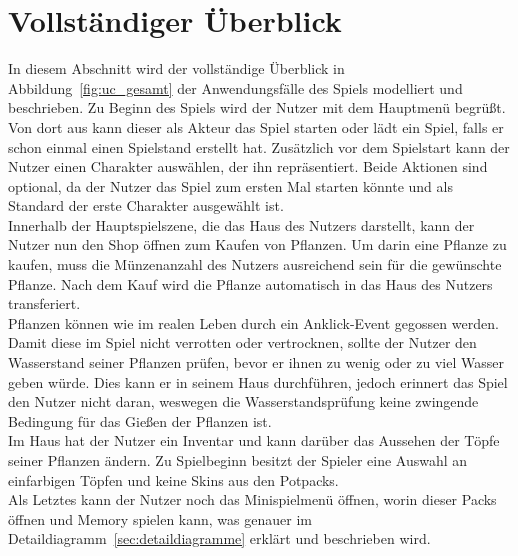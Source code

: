\section{Vollständiger Überblick}\label{sec:vollstandiger-uberblick}
In diesem Abschnitt wird der vollständige Überblick in Abbildung~\ref{fig:uc_gesamt} der Anwendungsfälle des Spiels 
modelliert und beschrieben.
Zu Beginn des Spiels wird der Nutzer mit dem Hauptmenü begrüßt.
Von dort aus kann dieser als Akteur das Spiel starten oder lädt ein Spiel, falls er schon einmal einen Spielstand 
erstellt hat.
Zusätzlich vor dem Spielstart kann der Nutzer einen Charakter auswählen, der ihn repräsentiert. 
Beide Aktionen sind optional, da der Nutzer das Spiel zum ersten Mal starten könnte und als Standard der erste 
Charakter ausgewählt ist.\\
Innerhalb der Hauptspielszene, die das Haus des Nutzers darstellt, kann der Nutzer nun den Shop öffnen zum Kaufen 
von Pflanzen. 
Um darin eine Pflanze zu kaufen, muss die Münzenanzahl des Nutzers ausreichend sein für die gewünschte Pflanze.
Nach dem Kauf wird die Pflanze automatisch in das Haus des Nutzers transferiert.\\
Pflanzen können wie im realen Leben durch ein Anklick-Event gegossen werden.
Damit diese im Spiel nicht verrotten oder vertrocknen, sollte der Nutzer den Wasserstand seiner Pflanzen prüfen, 
bevor er ihnen zu wenig oder zu viel Wasser geben würde. 
Dies kann er in seinem Haus durchführen, jedoch erinnert das Spiel den Nutzer nicht daran, 
weswegen die Wasserstandsprüfung keine zwingende Bedingung für das Gießen der Pflanzen ist.\\
Im Haus hat der Nutzer ein Inventar und kann darüber das Aussehen der Töpfe seiner Pflanzen ändern. 
Zu Spielbeginn besitzt der Spieler eine Auswahl an einfarbigen Töpfen und keine Skins aus den Potpacks. \\ 
Als Letztes kann der Nutzer noch das Minispielmenü öffnen, worin dieser Packs öffnen und Memory spielen kann,
was genauer im Detaildiagramm~\ref{sec:detaildiagramme} erklärt und beschrieben wird.

